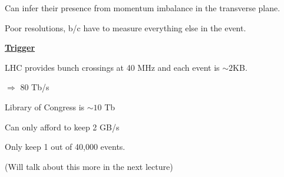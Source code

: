 {Can infer their presence from momentum imbalance in the transverse plane.

Poor resolutions, b/c have to measure everything else in the event.

\textbf{\underline{Trigger}}

LHC provides bunch crossings at 40 MHz and each event is $\sim 2$KB.

 $\Rightarrow $ 80 Tb/s 

Library of Congress is $\sim 10$ Tb

Can only afford to keep 2 GB/s

Only keep 1 out of 40,000 events.

(Will talk about this more in the next lecture)


}



